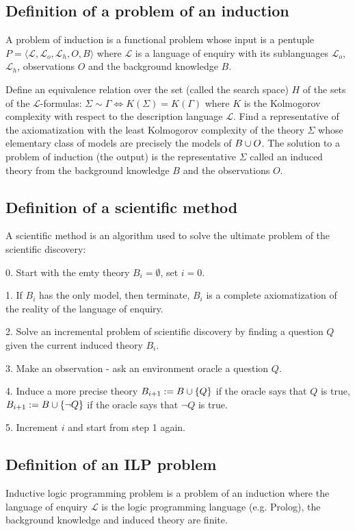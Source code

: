 \subsection{Definition of a problem of an induction}
A problem of induction is a functional problem whose input is a pentuple $P=\langle\mathcal{L}, \mathcal{L}_o, \mathcal{L}_h, O, B\rangle$ where $\mathcal{L}$ is a language of enquiry with its sublanguages $\mathcal{L}_o$, $\mathcal{L}_h$, observations $O$ and the background knowledge $B$.

Define an equivalence relation over the set (called the search space) $H$ of the sets of the $\mathcal{L}$-formulas: $\Sigma \sim \Gamma \iff K(\Sigma)=K(\Gamma)$ where $K$ is the Kolmogorov complexity with respect to the description language $\mathcal{L}$. Find a representative of the axiomatization with the least Kolmogorov complexity of the theory $\Sigma$ whose elementary class of models are precisely the models of $B \cup O$. The solution  to a problem of induction (the output) is the representative $\Sigma$ called an induced theory from the background knowledge $B$ and the observations $O$.

\subsection{Definition of a scientific method}
A scientific method is an algorithm used to solve the ultimate problem of the scientific discovery:

0. Start with the emty theory $B_i=\emptyset$, set $i=0$.

1. If $B_i$ has the only model, then terminate, $B_i$ is a complete axiomatization of the reality of the language of enquiry.

2. Solve an incremental problem of scientific discovery by finding a question $Q$ given the current induced theory $B_i$.

3. Make an observation - ask an environment oracle a question $Q$.

4. Induce a more precise theory $B_{i+1}:=B \cup \{Q\}$ if the oracle says that $Q$ is true, $B_{i+1}:=B \cup \{\neg Q\}$ if the oracle says that $\neg Q$ is true.

5. Increment $i$ and start from step 1 again.

\subsection{Definition of an ILP problem}
Inductive logic programming problem is a problem of an induction where the language of enquiry $\mathcal{L}$ is the logic programming language (e.g. Prolog), the background knowledge and induced theory are finite.

